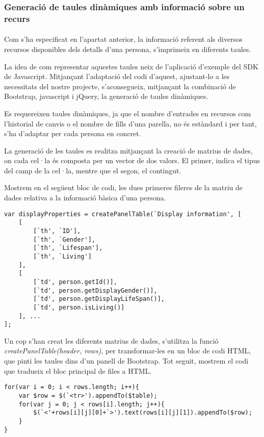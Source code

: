 \subsubsection{Generació de taules dinàmiques amb informació sobre un recurs}

\paragraph{}
Com s'ha especificat en l'apartat anterior, la informació referent als diversos recursos disponibles dels detalls d'una persona, s'imprimeix en diferents taules.

La idea de com representar aquestes taules neix de l'aplicació d'exemple del SDK de Javascript. Mitjançant l'adaptació del codi d'aquest, ajustant-lo a les necessitats del nostre projecte, s'aconsegueix, mitjançant la combinació de Bootstrap, javascript i jQuery, la generació de taules dinàmiques.

Es requereixen taules dinàmiques, ja que el nombre d'entrades en recursos com l'historial de canvis o el nombre de fills d'una parella, no és estàndard i per tant, s'ha d'adaptar per cada persona en concret.

La generació de les taules es realitza mitjançant la creació de matrius de dades, on cada cel·la és composta per un vector de dos valors. El primer, indica el tipus del camp de la cel·la, mentre que el segon, el contingut.

Mostrem en el següent bloc de codi, les dues primeres fileres de la matriu de dades relativa a la informació bàsica d'una persona.

\begin{lstlisting}[style=rawOwn,caption={Exemple de les dues primeres files, d'una matriu de dades}]
var displayProperties = createPanelTable(`Display information', [
    [
        [`th', `ID'],
        [`th', `Gender'],
        [`th', `Lifespan'],
        [`th', `Living']
    ],
    [
        [`td', person.getId()],
        [`td', person.getDisplayGender()],
        [`td', person.getDisplayLifeSpan()],
        [`td', person.isLiving()]
    ], ...
];
\end{lstlisting}

Un cop s'han creat les diferents matrius de dades, s'utilitza la funció \emph{create\-Panel\-Table(header, rows)}, per transformar-les en un bloc de codi HTML, que pinti les taules dins d'un panell de Bootstrap. Tot seguit, mostrem el codi que tradueix el bloc principal de files a HTML.

\begin{lstlisting}[style=rawOwn,caption={Transformació de files d'una matriu en HTML}]
for(var i = 0; i < rows.length; i++){
    var $row = $(`<tr>').appendTo($table);
    for(var j = 0; j < rows[i].length; j++){
        $(`<'+rows[i][j][0]+`>').text(rows[i][j][1]).appendTo($row);
    }
}
\end{lstlisting}
